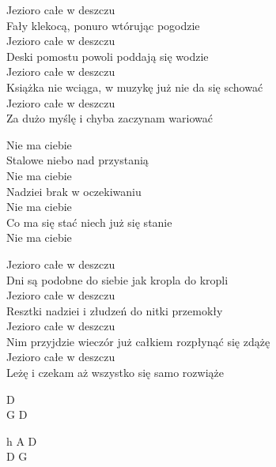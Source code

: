 \begin{text}
Jezioro całe w deszczu\\
Fały klekocą, ponuro wtórując pogodzie\\
Jezioro całe w deszczu\\
Deski pomostu powoli poddają się wodzie\\
Jezioro całe w deszczu\\
Książka nie wciąga, w muzykę już nie da się schować\\
Jezioro całe w deszczu\\
Za dużo myślę i chyba zaczynam wariować

\vin Nie ma ciebie\\
\vin Stalowe niebo nad przystanią\\
\vin Nie ma ciebie\\
\vin Nadziei brak w oczekiwaniu\\
\vin Nie ma ciebie\\
\vin Co ma się stać niech już się stanie\\
\vin Nie ma ciebie

Jezioro całe w deszczu\\
Dni są podobne do siebie jak kropla do kropli\\
Jezioro całe w deszczu\\
Resztki nadziei i złudzeń do nitki przemokły\\
Jezioro całe w deszczu\\
Nim przyjdzie wieczór już całkiem rozpłynąć się zdążę\\
Jezioro całe w deszczu\\
Leżę i czekam aż wszystko się samo rozwiąże
\end{text}
\begin{chord}
    D\\
    G D

    \hfill\break
    \hfill\break
    \hfill\break
    \hfill\break
    \hfill\break
    \hfill\break
    h A D\\
    D G
\end{chord}